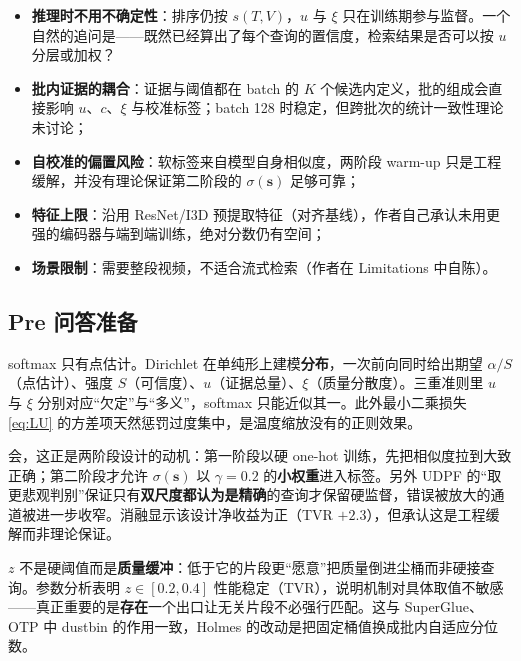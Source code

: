 \documentclass[11pt,a4paper,UTF8,fontset=windows]{ctexart}
\newcommand{\term}[1]{\textbf{#1}}
\newcommand{\vect}[1]{\boldsymbol{#1}}
\begin{document}
\begin{itemize}[itemsep=1pt,topsep=2pt]
  \item \term{推理时不用不确定性}：排序仍按 $s(T,V)$，$u$ 与 $\xi$ 只在训练期参与监督。一个自然的追问是——既然已经算出了每个查询的置信度，检索结果是否可以按 $u$ 分层或加权？
  \item \term{批内证据的耦合}：证据与阈值都在 batch 的 $K$ 个候选内定义，批的组成会直接影响 $u$、$c$、$\xi$ 与校准标签；batch 128 时稳定，但跨批次的统计一致性理论未讨论；
  \item \term{自校准的偏置风险}：软标签来自模型自身相似度，两阶段 warm-up 只是工程缓解，并没有理论保证第二阶段的 $\sigma(\vect s)$ 足够可靠；
  \item \term{特征上限}：沿用 ResNet/I3D 预提取特征（对齐基线），作者自己承认未用更强的编码器与端到端训练，绝对分数仍有空间；
  \item \term{场景限制}：需要整段视频，不适合流式检索（作者在 Limitations 中自陈）。
\end{itemize}

\subsection{Pre 问答准备}

\begin{thinkbox}
softmax 只有点估计。Dirichlet 在单纯形上建模\term{分布}，一次前向同时给出期望 $\alpha/S$（点估计）、强度 $S$（可信度）、$u$（证据总量）、$\xi$（质量分散度）。三重准则里 $u$ 与 $\xi$ 分别对应“欠定”与“多义”，softmax 只能近似其一。此外最小二乘损失 \eqref{eq:LU} 的方差项天然惩罚过度集中，是温度缩放没有的正则效果。
\end{thinkbox}

\begin{thinkbox}
会，这正是两阶段设计的动机：第一阶段以硬 one-hot 训练，先把相似度拉到大致正确；第二阶段才允许 $\sigma(\vect s)$ 以 $\gamma=0.2$ 的\term{小权重}进入标签。另外 UDPF 的“取更悲观判别”保证只有\term{双尺度都认为是精确}的查询才保留硬监督，错误被放大的通道被进一步收窄。消融显示该设计净收益为正（TVR $+2.3$），但承认这是工程缓解而非理论保证。
\end{thinkbox}

\begin{thinkbox}
$z$ 不是硬阈值而是\term{质量缓冲}：低于它的片段更“愿意”把质量倒进尘桶而非硬接查询。参数分析表明 $z\in[0.2,0.4]$ 性能稳定（TVR），说明机制对具体取值不敏感——真正重要的是\term{存在}一个出口让无关片段不必强行匹配。这与 SuperGlue、OTP 中 dustbin 的作用一致，Holmes 的改动是把固定桶值换成批内自适应分位数。
\end{thinkbox}
\end{document}
